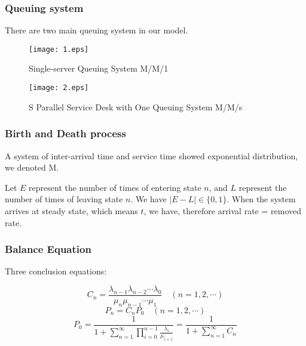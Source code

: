 \documentclass{mcmthesis}
\begin{document}
\subsubsection*{Queuing system}
\par There are two main queuing system in our model.

\begin{figure}[!h]
\small
\centering
\texttt{[image: 1.eps]}
\caption{Single-server Queuing System M/M/1} \label{Single-server Queuing System M/M/1}
\end{figure}
\begin{figure}[!h]
\small
\centering
\texttt{[image: 2.eps]}
\caption{S Parallel Service Desk with One Queuing System M/M/s} \label{S Parallel Service Desk with One Queuing System M/M/}
\end{figure}

\subsubsection*{Birth and Death process}
\par A system of inter-arrival time and service time showed exponential distribution, we denoted M.
\par Let $E$ represent the number of times of entering state $n$, and $L$ represent the number of times of leaving state $n$. We have $|E-L| \in \{0,1\}$. When the system arrives at steady state, which means $t$, we have, therefore arrival rate = removed rate.

\subsubsection*{Balance Equation}
\par Three conclusion equations:

\begin{equation}
	C_n = \frac{\lambda_{n-1}\lambda_{n-2}\cdots\lambda_0}{\mu_{n}\mu_{n-1}\cdots\mu_1} \quad (n = 1, 2, \cdots)  \label{C_n}
\end{equation}
\begin{equation}
	P_n = C_n P_0 \quad (n = 1, 2, \cdots)  \label{p_n}
\end{equation}
\begin{equation}
P_0 = {\frac{1}{1+\sum \limits_{n=1}^{\infty} \prod \limits_{i=0}^{n-1}{\frac{\lambda _i}{\mu _{{i+1}}}}}} =\frac{1}{1+\sum\limits_{n=1}^{\infty} C_n} \label{p_0}
\end{equation}
\end{document}
